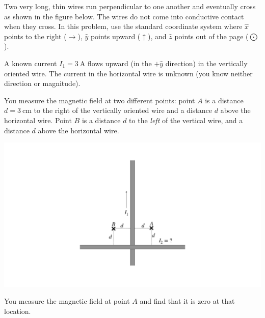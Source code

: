 \question Two very long, thin wires run perpendicular to one another and eventually cross as shown in the figure below. The wires do not come into conductive contact when they cross. In this problem, use the standard coordinate system where $\hat{x}$ points to the right ($\rightarrow$), $\hat{y}$ points upward ($\uparrow$), and $\hat{z}$ points out of the page ($\bigodot$).

A known current $I_1=3\ \mathrm{A}$ flows upward (in the $+\hat{y}$ direction) in the vertically oriented wire. The current in the horizontal wire is unknown (you know neither direction or magnitude).

You measure the magnetic field at two different points: point $A$ is a distance $d=3\ \mathrm{cm}$ to the right of the vertically oriented wire and a distance $d$ above the horizontal wire. Point $B$ is a distance $d$ to the \textit{left} of the vertical wire, and a distance $d$ above the horizontal wire.


\begin{center}
	\includegraphics[width=.4\textwidth]{perp_wires.pdf}
\end{center}


You measure the magnetic field at point $A$ and find that it is zero at that location.
